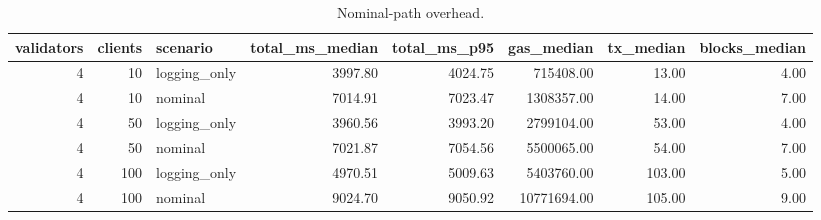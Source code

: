 \begin{table}
\caption{Nominal-path overhead.}
\label{tab:contestfl-nominal}
\begin{tabular}{rrlrrrrr}
\toprule
validators & clients & scenario & total\_ms\_median & total\_ms\_p95 & gas\_median & tx\_median & blocks\_median \\
\midrule
4 & 10 & logging\_only & 3997.80 & 4024.75 & 715408.00 & 13.00 & 4.00 \\
4 & 10 & nominal & 7014.91 & 7023.47 & 1308357.00 & 14.00 & 7.00 \\
4 & 50 & logging\_only & 3960.56 & 3993.20 & 2799104.00 & 53.00 & 4.00 \\
4 & 50 & nominal & 7021.87 & 7054.56 & 5500065.00 & 54.00 & 7.00 \\
4 & 100 & logging\_only & 4970.51 & 5009.63 & 5403760.00 & 103.00 & 5.00 \\
4 & 100 & nominal & 9024.70 & 9050.92 & 10771694.00 & 105.00 & 9.00 \\
\bottomrule
\end{tabular}
\end{table}
